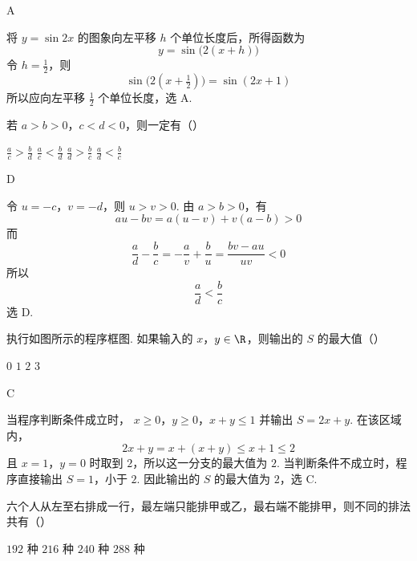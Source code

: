 \begin{answer}
A
\end{answer}

\begin{solution}
将 \(y=\sin2x\) 的图象向左平移 \(h\) 个单位长度后，所得函数为
\[
y=\sin\bigl(2(x+h)\bigr)
\]
令 \(h=\frac12\)，则
\[
\sin\bigl(2(x+\tfrac12)\bigr)=\sin(2x+1)
\]
所以应向左平移 \(\frac12\) 个单位长度，选 A.
\end{solution}

\begin{problem}
若 \(a > b > 0\)，\(c < d < 0\)，则一定有（\quad）

\choices
    {\(\frac{a}{c} >\frac{b}{d}\)}
    {\(\frac{a}{c} < \frac{b}{d}\)}
    {\(\frac{a}{d} > \frac{b}{c}\)}
    {\(\frac{a}{d} < \frac{b}{c}\)}
\end{problem}

\begin{answer}
D
\end{answer}

\begin{solution}
令 \(u=-c\)，\(v=-d\)，则 \(u>v>0\). 由 \(a>b>0\)，有
\[
au-bv=a(u-v)+v(a-b)>0
\]
而
\[
\frac{a}{d}-\frac{b}{c}=-\frac{a}{v}+\frac{b}{u}
=\frac{bv-au}{uv}<0
\]
所以
\[
\frac{a}{d}<\frac{b}{c}
\]
选 D.
\end{solution}

\begin{problem}
执行如图所示的程序框图. 如果输入的 \(x\)，\(y \in \R\)，则输出的 \(S\) 的最大值（\quad）


\choices
    {\(0\)}
    {\(1\)}
    {\(2\)}
    {\(3\)}
\end{problem}

\begin{answer}
C
\end{answer}

\begin{solution}
当程序判断条件成立时，
\(x\geqslant0\)，\(y\geqslant0\)，\(x+y\leqslant1\)
并输出 \(S=2x+y\). 在该区域内，
\[
2x+y=x+(x+y)\leqslant x+1\leqslant2
\]
且 \(x=1\)，\(y=0\) 时取到 \(2\)，所以这一分支的最大值为 \(2\). 当判断条件不成立时，程序直接输出 \(S=1\)，小于 \(2\). 因此输出的 \(S\) 的最大值为 \(2\)，选 C.
\end{solution}

\begin{problem}
六个人从左至右排成一行，最左端只能排甲或乙，最右端不能排甲，则不同的排法共有（\quad）

\choices
    {\(192\text{ 种}\)}
    {\(216\text{ 种}\)}
    {\(240\text{ 种}\)}
    {\(288\text{ 种}\)}
\end{problem}

